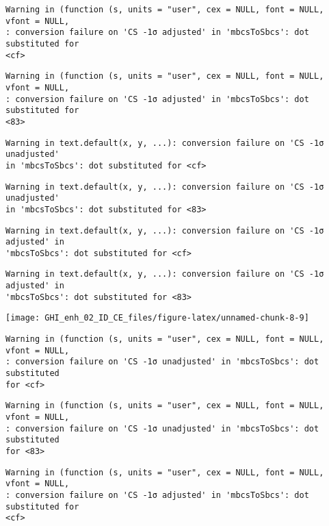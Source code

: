 \documentclass[
  10pt,
  a4paper,oneside]{article}
\begin{document}
\begin{verbatim}
Warning in (function (s, units = "user", cex = NULL, font = NULL, vfont = NULL,
: conversion failure on 'CS -1σ adjusted' in 'mbcsToSbcs': dot substituted for
<cf>
\end{verbatim}

\begin{verbatim}
Warning in (function (s, units = "user", cex = NULL, font = NULL, vfont = NULL,
: conversion failure on 'CS -1σ adjusted' in 'mbcsToSbcs': dot substituted for
<83>
\end{verbatim}

\begin{verbatim}
Warning in text.default(x, y, ...): conversion failure on 'CS -1σ unadjusted'
in 'mbcsToSbcs': dot substituted for <cf>
\end{verbatim}

\begin{verbatim}
Warning in text.default(x, y, ...): conversion failure on 'CS -1σ unadjusted'
in 'mbcsToSbcs': dot substituted for <83>
\end{verbatim}

\begin{verbatim}
Warning in text.default(x, y, ...): conversion failure on 'CS -1σ adjusted' in
'mbcsToSbcs': dot substituted for <cf>
\end{verbatim}

\begin{verbatim}
Warning in text.default(x, y, ...): conversion failure on 'CS -1σ adjusted' in
'mbcsToSbcs': dot substituted for <83>
\end{verbatim}

\begin{center}\texttt{[image: GHI\_enh\_02\_ID\_CE\_files/figure-latex/unnamed-chunk-8-9]} \end{center}

\begin{verbatim}
Warning in (function (s, units = "user", cex = NULL, font = NULL, vfont = NULL,
: conversion failure on 'CS -1σ unadjusted' in 'mbcsToSbcs': dot substituted
for <cf>
\end{verbatim}

\begin{verbatim}
Warning in (function (s, units = "user", cex = NULL, font = NULL, vfont = NULL,
: conversion failure on 'CS -1σ unadjusted' in 'mbcsToSbcs': dot substituted
for <83>
\end{verbatim}

\begin{verbatim}
Warning in (function (s, units = "user", cex = NULL, font = NULL, vfont = NULL,
: conversion failure on 'CS -1σ adjusted' in 'mbcsToSbcs': dot substituted for
<cf>
\end{verbatim}
\end{document}
